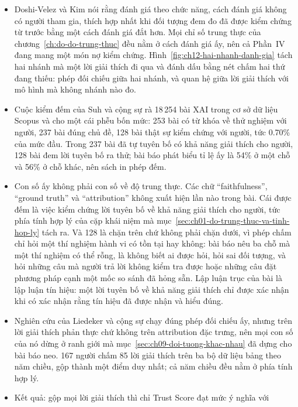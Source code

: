 \begin{tomtat}
\begin{itemize}
  \item Doshi-Velez và Kim nói rằng đánh giá theo chức năng, cách đánh giá
  không có người tham gia, thích hợp nhất khi đối tượng đem đo đã được kiểm
  chứng từ trước bằng một cách đánh giá đắt hơn. Mọi chỉ số trung thực của
  chương~\ref{ch:do-do-trung-thuc} đều nằm ở cách đánh giá ấy, nên cả Phần~IV
  đang mang một món nợ kiểm chứng. Hình~\ref{fig:ch12-hai-nhanh-danh-gia} tách
  hai nhánh mà một lời giải thích đi qua và đánh dấu bằng nét chấm hai thứ
  đang thiếu: phép đối chiếu giữa hai nhánh, và quan hệ giữa lời giải thích
  với mô hình mà không nhánh nào đo.
  \item Cuộc kiểm đếm của Suh và cộng sự rà 18\,254 bài XAI trong cơ sở dữ liệu
  Scopus và cho một cái phễu bốn mức: 253 bài có từ khóa về thử nghiệm với
  người, 237 bài đúng chủ đề, 128 bài thật sự kiểm chứng với người, tức 0.70\%
  của mức đầu. Trong 237 bài đã tự tuyên bố có khả năng giải thích cho người,
  128 bài đem lời tuyên bố ra thử; bài báo phát biểu tỉ lệ ấy là 54\% ở một chỗ
  và 56\% ở chỗ khác, nên sách in phép đếm.
  \item Con số ấy không phải con số về độ trung thực. Các chữ
  \enquote{faithfulness}, \enquote{ground truth} và \enquote{attribution} không
  xuất hiện lần nào trong bài. Cái được đếm là việc kiểm chứng lời tuyên bố về
  khả năng giải thích cho người, tức phía tính hợp lý của cặp khái niệm mà
  mục~\ref{sec:ch01-do-trung-thuc-va-tinh-hop-ly} tách ra. Và 128 là chặn trên
  chứ không phải chặn dưới, vì phép chấm chỉ hỏi một thí nghiệm hành vi có tồn
  tại hay không: bài báo nêu ba chỗ mà một thí nghiệm có thể rỗng, là không
  biết ai được hỏi, hỏi sai đối tượng, và hỏi những câu mà người trả lời không
  kiểm tra được hoặc những câu đặt phương pháp cạnh một mốc so sánh đã hỏng
  sẵn. Lập luận trục của bài là lập luận tín hiệu: một lời tuyên bố về khả năng
  giải thích chỉ được xác nhận khi có xác nhận rằng tín hiệu đã được nhận và
  hiểu đúng.
  \item Nghiên cứu của Liedeker và cộng sự chạy đúng phép đối chiếu ấy, nhưng
  trên lời giải thích phản thực chứ không trên attribution đặc trưng, nên mọi
  con số của nó dừng ở ranh giới mà mục~\ref{sec:ch09-doi-tuong-khac-nhau} đã
  dựng cho bài báo neo. 167 người chấm 85 lời giải thích trên ba bộ dữ liệu
  bảng theo năm chiều, gộp thành một điểm duy nhất; cả năm chiều đều nằm ở phía
  tính hợp lý.
  \item Kết quả: gộp mọi lời giải thích thì chỉ Trust Score đạt mức ý nghĩa với

\end{itemize}
\end{tomtat}

